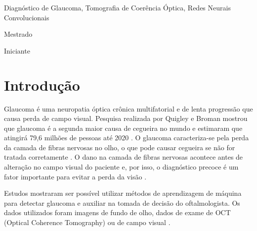 \documentclass[conference]{IEEEtran}
\begin{document}
\renewcommand\IEEEkeywordsname{Palavras-chave}
\begin{IEEEkeywords}
\label{Palavras-chave}
Diagnóstico de Glaucoma, Tomografia de Coerência Óptica, Redes Neurais Convolucionais
\end{IEEEkeywords}

\renewcommand\IEEEkeywordsname{Classifica\c{c}\~{a}o}
\begin{IEEEkeywords}
	\label{classificacao}
	Mestrado
\end{IEEEkeywords}

\renewcommand\IEEEkeywordsname{Categoria}
\begin{IEEEkeywords}
	\label{Categoria}
	Iniciante 
\end{IEEEkeywords}

\IEEEpeerreviewmaketitle


\section{Introdução}



Glaucoma é uma neuropatia óptica crônica multifatorial e de lenta progressão que causa perda de campo visual. Pesquisa realizada por Quigley e Broman mostrou que glaucoma é a segunda maior causa de cegueira no mundo e estimaram que atingirá 79,6 milhões de pessoas até 2020 \cite{Quigley2006}. O glaucoma caracteriza-se pela perda da camada de fibras nervosas no olho, o que pode causar cegueira se não for tratada corretamente \cite{Quigley2011}. O dano na camada de fibras nervosas acontece antes de alteração no campo visual do paciente e, por isso, o diagnóstico precoce é um fator importante para evitar a perda da visão \cite{Malik2012}.

Estudos mostraram ser possível utilizar métodos de aprendizagem de máquina para detectar glaucoma e auxiliar na tomada de decisão do oftalmologista. Os dados utilizados foram imagens de fundo de olho, dados de exame de OCT (Optical Coherence Tomography) ou de campo visual \cite{Gracitelli2015, Asaoka2016, bowd2008, silva2013, kwokleung2002, kumar2016}. 
\end{document}
